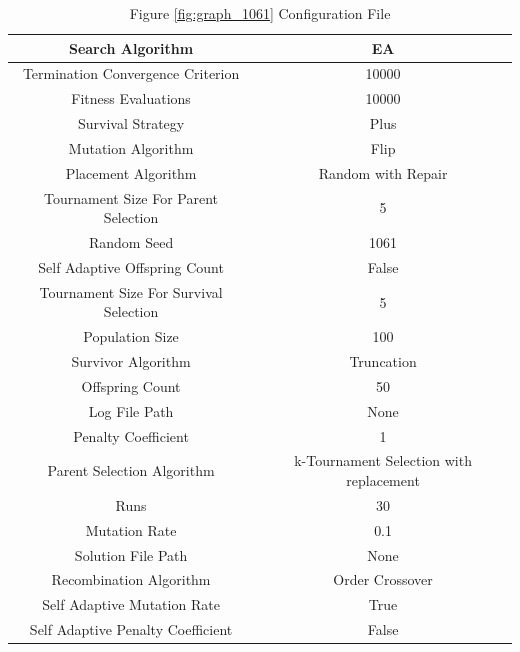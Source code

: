 \documentclass{standalone}
\begin{document}
\clearpage
\begin{table}[!htb]
	\centering
	\caption{Figure \ref{fig:graph_1061} Configuration File}
	\label{tab:graph_1061}
	\begin{tabular}{| c | c |}
		\hline
		Search Algorithm		& EA		 \\
		\hline
		Termination Convergence Criterion		& 10000		 \\
		\hline
		Fitness Evaluations		& 10000		 \\
		\hline
		Survival Strategy		& Plus		 \\
		\hline
		Mutation Algorithm		& Flip		 \\
		\hline
		Placement Algorithm		& Random with Repair		 \\
		\hline
		Tournament Size For Parent Selection		& 5		 \\
		\hline
		Random Seed		& 1061		 \\
		\hline
		Self Adaptive Offspring Count		& False		 \\
		\hline
		Tournament Size For Survival Selection		& 5		 \\
		\hline
		Population Size		& 100		 \\
		\hline
		Survivor Algorithm		& Truncation		 \\
		\hline
		Offspring Count		& 50		 \\
		\hline
		Log File Path		& None		 \\
		\hline
		Penalty Coefficient		& 1		 \\
		\hline
		Parent Selection Algorithm		& k-Tournament Selection with replacement		 \\
		\hline
		Runs		& 30		 \\
		\hline
		Mutation Rate		& 0.1		 \\
		\hline
		Solution File Path		& None		 \\
		\hline
		Recombination Algorithm		& Order Crossover		 \\
		\hline
		Self Adaptive Mutation Rate		& True		 \\
		\hline
		Self Adaptive Penalty Coefficient		& False		 \\
		\hline
	\end{tabular}
\end{table}
\end{document}
